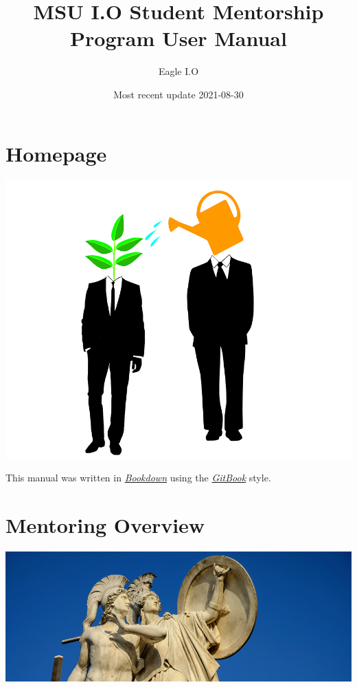 \documentclass[
  openany]{book}
\title{MSU I.O Student Mentorship Program User Manual}
\author{Eagle I.O}
\date{Most recent update 2021-08-30}
\begin{document}
\maketitle

{
\setcounter{tocdepth}{1}
\tableofcontents
}
\hypertarget{Homepage}{%
\chapter*{Homepage}\label{Homepage}}

\includegraphics{images/cover.png}

This manual was written in \href{https://bookdown.org/}{\emph{Bookdown}} using the \href{https://bookdown.org/yihui/bookdown/html.html}{\emph{GitBook}} style.

\hypertarget{mentoring-overview}{%
\chapter{Mentoring Overview}\label{mentoring-overview}}

\includegraphics{images/greek.jpg}
\end{document}
